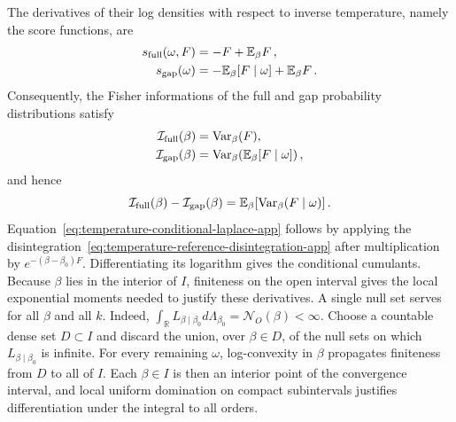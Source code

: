 \documentclass[a4paper,11pt]{article}
\def\dd{d}%
\def\ee{e}%
\theoremstyle{definition}
\theoremstyle{remark}
\newcommand{\dd}{\mathrm d}
\newcommand{\ee}{\mathrm e}
\newcommand{\RR}{\mathbb R}
\begin{document}
The derivatives of their log densities with respect to inverse temperature, namely the score
functions, are
\begin{equation}
\begin{aligned}
   s_{\rm full}(\omega,F)&=-F+\mathbb E_\beta F\,,\\
   s_{\rm gap}(\omega)&=-\mathbb E_\beta[F\mid\omega]+\mathbb E_\beta F\,.
\end{aligned}
   \label{eq:temperature-scores-app}
\end{equation}
Consequently, the Fisher informations of the full and gap probability distributions satisfy
\begin{equation}
\begin{aligned}
   \mathcal I_{\rm full}(\beta)&=\operatorname{Var}_\beta(F),\\
   \mathcal I_{\rm gap}(\beta)
      &=\operatorname{Var}_\beta\!\left(\mathbb E_\beta[F\mid\omega]\right),
\end{aligned}
   \label{eq:temperature-fisher-information-app}
\end{equation}
and hence
\begin{equation}
   \mathcal I_{\rm full}(\beta)-\mathcal I_{\rm gap}(\beta)
   =\mathbb E_\beta\!\left[\operatorname{Var}_\beta(F\mid\omega)\right].
   \label{eq:temperature-fisher-deficit-app}
\end{equation}
Equation~\eqref{eq:temperature-conditional-laplace-app} follows by applying the
disintegration~\eqref{eq:temperature-reference-disintegration-app} after multiplication by
$\ee^{-(\beta-\beta_0)F}$.  Differentiating its logarithm gives the conditional cumulants.  Because
$\beta$ lies in the interior of $I$, finiteness on the open interval gives the local
exponential moments needed to justify these derivatives.  
A single null set serves for all $\beta$ and all $k$. Indeed,
$\int_\RR L_{\beta\mid\beta_0}\dd\Lambda_{\beta_0}=\mathcal N_O(\beta)<\infty$.
Choose a countable dense set $D\subset I$ and discard the union, over $\beta\in D$, of the null sets on which $L_{\beta\mid\beta_0}$ is infinite. For every remaining $\omega$, log-convexity in $\beta$ propagates finiteness from $D$ to all of $I$. Each $\beta\in I$ is then an interior point of the convergence interval, and local uniform domination on compact subintervals justifies differentiation under the integral to all orders.
\end{document}

